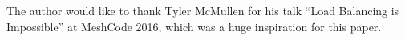 The author would like to thank Tyler McMullen for his talk ``Load Balancing is
Impossible'' at MeshCode 2016, which was a huge inspiration for this paper.
